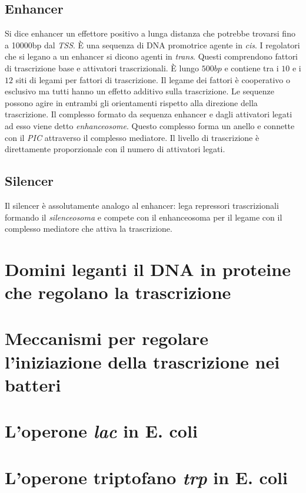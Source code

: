 \subsection{Enhancer}
Si dice enhancer un effettore positivo a lunga distanza che potrebbe trovarsi fino a \num{10000}\si{bp} dal \emph{TSS}. \`E una sequenza di DNA promotrice agente in \emph{cis}. I 
regolatori che si legano a un enhancer si dicono agenti in \emph{trans}. Questi comprendono fattori di trascrizione base e attivatori trascrizionali. \`E lungo $500bp$ e contiene 
tra i $10$ e i $12$ siti di legami per fattori di trascrizione. Il legame dei fattori \`e cooperativo o esclusivo ma tutti hanno un effetto additivo sulla trascrizione. Le sequenze 
possono agire in entrambi gli orientamenti rispetto alla direzione della trascrizione. Il complesso formato da sequenza enhancer e dagli attivatori legati ad esso viene detto 
\emph{enhanceosome}. Questo complesso forma un anello e connette con il \emph{PIC} attraverso il complesso mediatore. Il livello di trascrizione \`e direttamente proporzionale con 
il numero di attivatori legati. 
\subsection{Silencer}
Il silencer \`e assolutamente analogo al enhancer: lega repressori trascrizionali formando il \emph{silenceosoma} e compete con il enhanceosoma per il legame con il complesso 
mediatore che attiva la trascrizione.


\section{Domini leganti il DNA in proteine che regolano la trascrizione}

\section{Meccanismi per regolare l'iniziazione della trascrizione nei batteri}

\section{L'operone \emph{lac} in E. coli}

\section{L'operone triptofano \emph{trp} in E. coli}

